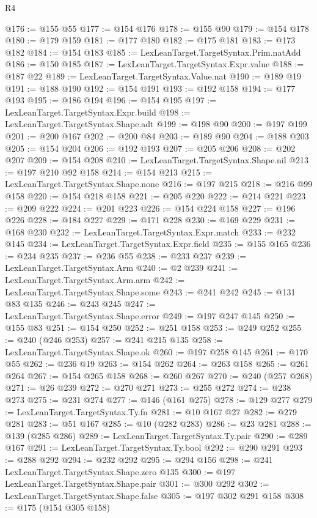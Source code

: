 \begin{lexlean}{R4}
\begin{coremodule}
@176 := @155 @55
@177 := @154 @176
@178 := @155 @90
@179 := @154 @178
@180 := @179 @159
@181 := @177 @180
@182 := @175 @181
@183 := @173 @182
@184 := @154 @183
@185 := LexLeanTarget.TargetSyntax.Prim.natAdd
@186 := @150 @185
@187 := LexLeanTarget.TargetSyntax.Expr.value
@188 := @187 @22
@189 := LexLeanTarget.TargetSyntax.Value.nat
@190 := @189 @19
@191 := @188 @190
@192 := @154 @191
@193 := @192 @158
@194 := @177 @193
@195 := @186 @194
@196 := @154 @195
@197 := LexLeanTarget.TargetSyntax.Expr.build
@198 := LexLeanTarget.TargetSyntax.Shape.adt
@199 := @198 @90
@200 := @197 @199
@201 := @200 @167
@202 := @200 @84
@203 := @189 @90
@204 := @188 @203
@205 := @154 @204
@206 := @192 @193
@207 := @205 @206
@208 := @202 @207
@209 := @154 @208
@210 := LexLeanTarget.TargetSyntax.Shape.nil
@213 := @197 @210 @92 @158
@214 := @154 @213
@215 := LexLeanTarget.TargetSyntax.Shape.none
@216 := @197 @215
@218 := @216 @99 @158
@220 := @154 @218 @158
@221 := @205 @220
@222 := @214 @221
@223 := @209 @222
@224 := @201 @223
@226 := @154 @224 @158
@227 := @196 @226
@228 := @184 @227
@229 := @171 @228
@230 := @169 @229
@231 := @168 @230
@232 := LexLeanTarget.TargetSyntax.Expr.match
@233 := @232 @145
@234 := LexLeanTarget.TargetSyntax.Expr.field
@235 := @155 @165
@236 := @234 @235
@237 := @236 @55
@238 := @233 @237
@239 := LexLeanTarget.TargetSyntax.Arm
@240 := @2 @239
@241 := LexLeanTarget.TargetSyntax.Arm.arm
@242 := LexLeanTarget.TargetSyntax.Shape.some
@243 := @241 @242
@245 := @131 @83 @135
@246 := @243 @245
@247 := LexLeanTarget.TargetSyntax.Shape.error
@249 := @197 @247 @145
@250 := @155 @83
@251 := @154 @250
@252 := @251 @158
@253 := @249 @252
@255 := @240 (@246 @253)
@257 := @241 @215 @135
@258 := LexLeanTarget.TargetSyntax.Shape.ok
@260 := @197 @258 @145
@261 := @170 @55
@262 := @236 @19
@263 := @154 @262
@264 := @263 @158
@265 := @261 @264
@267 := @154 @265 @158
@268 := @260 @267
@270 := @240 (@257 @268)
@271 := @26 @239
@272 := @270 @271
@273 := @255 @272
@274 := @238 @273
@275 := @231 @274
@277 := @146 (@161 @275)
@278 := @129 @277
@279 := LexLeanTarget.TargetSyntax.Ty.fn
@281 := @10 @167 @27
@282 := @279 @281
@283 := @51 @167
@285 := @10 (@282 @283)
@286 := @23 @281
@288 := @139 (@285 @286)
@289 := LexLeanTarget.TargetSyntax.Ty.pair
@290 := @289 @167
@291 := LexLeanTarget.TargetSyntax.Ty.bool
@292 := @290 @291
@293 := @288 @292
@294 := @232 @292
@295 := @294 @156
@298 := @241 LexLeanTarget.TargetSyntax.Shape.zero @135
@300 := @197 LexLeanTarget.TargetSyntax.Shape.pair
@301 := @300 @292
@302 := LexLeanTarget.TargetSyntax.Shape.false
@305 := @197 @302 @291 @158
@308 := @175 (@154 @305 @158)

\end{coremodule}
\end{lexlean}
